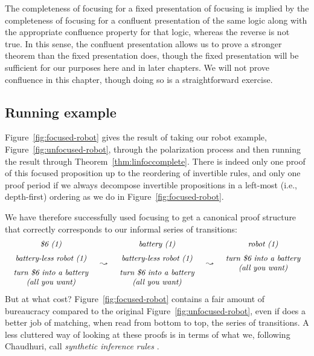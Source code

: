 The completeness of focusing for a fixed presentation of focusing is
implied by the completeness of focusing for a confluent presentation
of the same logic along with the appropriate confluence property for
that logic, whereas the reverse is not true. In this sense, the
confluent presentation allows us to prove a stronger theorem than the
fixed presentation does, though the fixed presentation will be
sufficient for our purposes here and in later chapters. We will not
prove confluence in this chapter, though doing so is a straightforward
exercise.

\subsection{Running example}
\label{sec:linlogtrans}



Figure~\ref{fig:focused-robot} gives the result of taking our robot
example, Figure~\ref{fig:unfocused-robot}, through the polarization
process and then running the result through
Theorem~\ref{thm:linfoccomplete}. There is indeed only one proof of
this focused proposition up to the reordering of invertible rules, and
only one proof period if we always decompose invertible propositions
in a left-most (i.e., depth-first) ordering as we do in
Figure~\ref{fig:focused-robot}.

We have therefore successfully used focusing to get a canonical
proof structure that correctly corresponds to our 
informal series of transitions:
\[
\begin{array}{ccccc}
\begin{array}{c}
\mbox{\it \$6 (1)}\medskip\\ 
\mbox{\it battery-less robot (1)} \medskip\\ 
\mbox{\it turn \$6 into a battery}\\
\mbox{\it (all you want)}
\end{array}
& \leadsto &
\begin{array}{c}
\mbox{\it battery  (1)}\medskip\\ 
\mbox{\it battery-less robot (1)} \medskip\\ 
\mbox{\it turn \$6 into a battery}\\
\mbox{\it (all you want)}
\end{array}
& \leadsto &
\begin{array}{c}
\mbox{\it robot (1)} \medskip\\ 
\mbox{\it turn \$6 into a battery}\\
\mbox{\it (all you want)}\medskip\\~\\
\end{array}
\end{array}
\]
But at what cost? Figure~\ref{fig:focused-robot} contains a
fair amount of bureaucracy compared to the original
Figure~\ref{fig:unfocused-robot}, even if does a better job of
matching, when read from bottom to top, the series of transitions. A
less cluttered way of looking at these proofs is in terms of what we,
following Chaudhuri, call {\it synthetic inference rules}
\cite{chaudhuri08focusing}.

